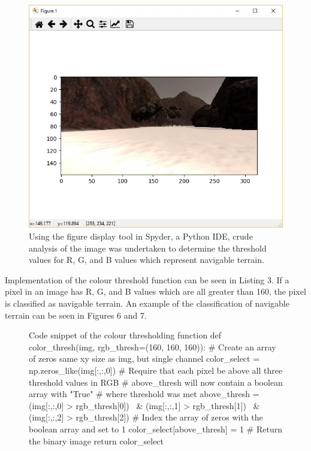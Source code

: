 \documentclass[a4paper]{article}
\begin{document}
\begin{figure}[h]
	\centering
	\includegraphics[scale=0.4]{rock_test}
	\caption{Using the figure display tool in Spyder, a Python IDE, crude analysis of the image was undertaken to determine the threshold values for R, G, and B values which represent navigable terrain.}
\end{figure}

Implementation of the colour threshold function can be seen in Listing 3. If a pixel in an image has R, G, and B values which are all greater than 160, the pixel is classified as navigable terrain. An example of the classification of navigable terrain can be seen in Figures 6 and 7.

\vspace{0.5cm}

\begin{figure}[H]\scriptsize
\begin{sexylisting}{Code snippet of the colour thresholding function}
def color_thresh(img, rgb_thresh=(160, 160, 160)):
    # Create an array of zeros same xy size as img, but single channel
    color_select = np.zeros_like(img[:,:,0])
    # Require that each pixel be above all three threshold values in RGB
    # above_thresh will now contain a boolean array with "True"
    # where threshold was met
    above_thresh = (img[:,:,0] > rgb_thresh[0]) \
                & (img[:,:,1] > rgb_thresh[1]) \
                & (img[:,:,2] > rgb_thresh[2])
    # Index the array of zeros with the boolean array and set to 1
    color_select[above_thresh] = 1
    # Return the binary image
    return color_select
\end{sexylisting}
\end{figure}
\end{document}
